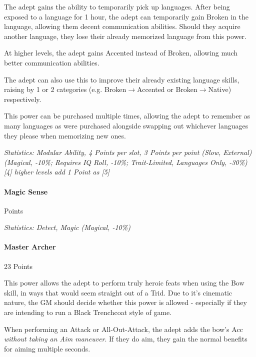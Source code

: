 \begin{multicols*}{3}
		The adept gains the ability to temporarily pick up languages. After being exposed to a language for 1 hour, the adept can temporarily gain Broken in the language, allowing them decent communication abilities. Should they acquire another language, they lose their already memorized language from this power.
		
		At higher levels, the adept gains Accented instead of Broken, allowing much better communication abilities.
		
		The adept can also use this to improve their already existing language skills, raising by 1 or 2 categories (e.g. Broken$\rightarrow$Accented or Broken$\rightarrow$Native) respectively.
		
		This power can be purchased multiple times, allowing the adept to remember as many languages as were purchased alongside swapping out whichever languages they please when memorizing new ones.

		\textcolor{OliveGreen}{\textit{Statistics: Modular Ability, 4 Points per slot, 3 Points per point (Slow, External) (Magical, -10\%; Requires IQ Roll, -10\%; Trait-Limited, Languages Only, -30\%) [4] higher levels add 1 Point as [5]}}
	
	\paragraph{Magic Sense}
	\begin{flushright}
		Points
	\end{flushright}

		\textcolor{OliveGreen}{\textit{Statistics: Detect, Magic (Magical, -10\%) }}
	
	\paragraph{Master Archer}
	\begin{flushright}
		23 Points
	\end{flushright}

		This power allows the adept to perform truly heroic feats when using the Bow skill, in ways that would seem straight out of a Trid. Due to it's cinematic nature, the GM should decide whether this power is allowed - especially if they are intending to run a Black Trenchcoat style of game.
		
		When performing an Attack or All-Out-Attack, the adept adds the bow's Acc \textit{without taking an Aim maneuver}. If they do aim, they gain the normal benefits for aiming multiple seconds.
		

\end{multicols*}
